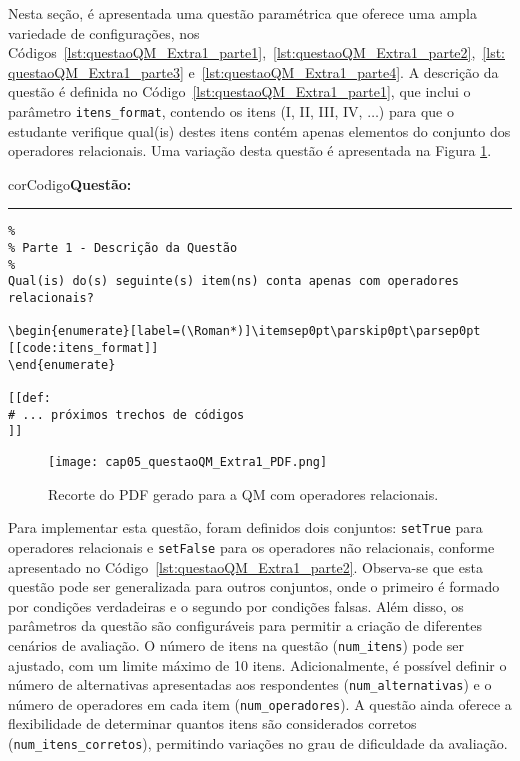 Nesta seção, é apresentada uma questão paramétrica que oferece uma ampla variedade de configurações, nos Códigos~\ref{lst:questaoQM_Extra1_parte1},~\ref{lst:questaoQM_Extra1_parte2},~\ref{lst:questaoQM_Extra1_parte3} e~\ref{lst:questaoQM_Extra1_parte4}.
%
A descrição da questão é definida no Código~\ref{lst:questaoQM_Extra1_parte1}, que inclui o parâmetro \verb|itens_format|, contendo os itens (I, II, III, IV, \(\ldots\)) para que o estudante verifique qual(is) destes itens contém apenas elementos do conjunto dos operadores relacionais. Uma variação desta questão é apresentada na Figura \ref{fig:questaoQM_Extra1_PDF}.

\begin{listing}[!ht]
    \begin{myboxCode}{corCodigo}{\textbf{Questão: }}\vspace{3mm}
    \hrule
    \begin{verbatim}
%
% Parte 1 - Descrição da Questão
%
Qual(is) do(s) seguinte(s) item(ns) conta apenas com operadores relacionais?

\begin{enumerate}[label=(\Roman*)]\itemsep0pt\parskip0pt\parsep0pt
[[code:itens_format]]
\end{enumerate}

[[def:
# ... próximos trechos de códigos
]]
\end{verbatim}
\end{myboxCode}
\caption{Exemplo de QM paramétrica de operadores relacionais -- Parte 1: Descrição de questão.}
\label{lst:questaoQM_Extra1_parte1}
\end{listing}

\begin{figure}[!ht]
    \texttt{[image: cap05\_questaoQM\_Extra1\_PDF.png]}
    \caption{Recorte do PDF gerado para a QM com operadores relacionais.}
    \label{fig:questaoQM_Extra1_PDF}
\end{figure}

Para implementar esta questão, foram definidos dois conjuntos: \verb|setTrue| para operadores relacionais e \verb|setFalse| para os operadores não relacionais, conforme apresentado no Código~\ref{lst:questaoQM_Extra1_parte2}. Observa-se que esta questão pode ser generalizada para outros conjuntos, onde o primeiro é formado por condições verdadeiras e o segundo por condições falsas. Além disso, os parâmetros da questão são configuráveis para permitir a criação de diferentes cenários de avaliação. O número de itens na questão (\verb|num_itens|) pode ser ajustado, com um limite máximo de 10 itens. Adicionalmente, é possível definir o número de alternativas apresentadas aos respondentes (\verb|num_alternativas|) e o número de operadores em cada item (\verb|num_operadores|). A questão ainda oferece a flexibilidade de determinar quantos itens são considerados corretos (\verb|num_itens_corretos|), permitindo variações no grau de dificuldade da avaliação.

